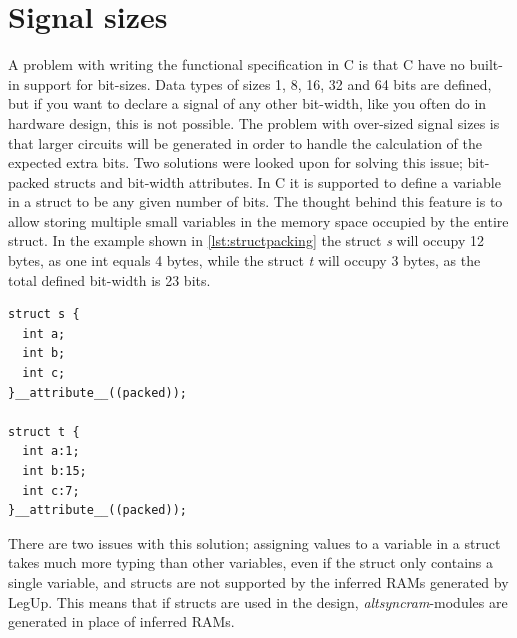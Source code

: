 \section{Signal sizes}
A problem with writing the functional specification in C is that C have no built-in support for bit-sizes. Data types of sizes 1, 8, 16, 32 and 64 bits are defined, but if you want to declare a signal of any other bit-width, like you often do in hardware design, this is not possible. The problem with over-sized signal sizes is that larger circuits will be generated in order to handle the calculation of the expected extra bits. Two solutions were looked upon for solving this issue; bit-packed structs and bit-width attributes. In C it is supported to define a variable in a struct to be any given number of bits. The thought behind this feature is to allow storing multiple small variables in the memory space occupied by the entire struct. In the example shown in \cref{lst:structpacking} the struct \textit{s} will occupy 12 bytes, as one int equals 4 bytes, while the struct \textit{t} will occupy 3 bytes, as the total defined bit-width is 23 bits.
\begin{lstlisting}[caption={Struct bit-packing example},label=lst:structpacking]
struct s {
  int a;
  int b;
  int c;
}__attribute__((packed));

struct t {
  int a:1;
  int b:15;
  int c:7;
}__attribute__((packed));
\end{lstlisting}
There are two issues with this solution; assigning values to a variable in a struct takes much more typing than other variables, even if the struct only contains a single variable, and structs are not supported by the inferred RAMs generated by LegUp. This means that if structs are used in the design, \textit{altsyncram}-modules are generated in place of inferred RAMs.

